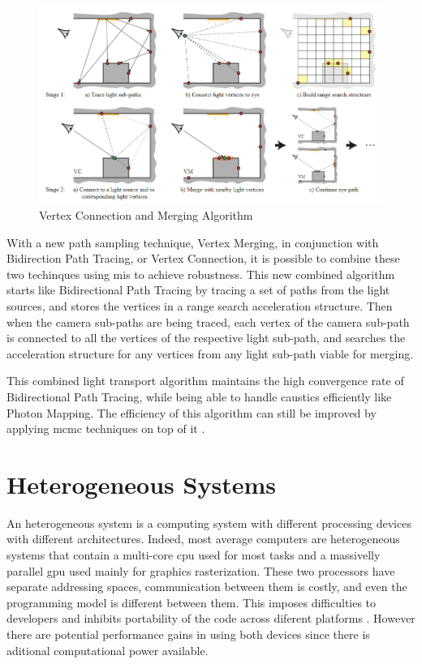 \begin{figure}[H]
\centering
\includegraphics[width=\linewidth]{img/vcmDiagram.png}
\caption{\label{img:vcmdiag} Vertex Connection and Merging Algorithm}
\end{figure}

With a new path sampling technique, Vertex Merging, in conjunction with Bidirection Path Tracing, or Vertex Connection, it is possible to combine these two techinques using \gls{mis} to achieve robustness. This new combined algorithm starts like Bidirectional Path Tracing by tracing a set of paths from the light sources, and stores the vertices in a range search acceleration structure. Then when the camera sub-paths are being traced, each vertex of the camera sub-path is connected to all the vertices of the respective light sub-path, and searches the acceleration structure for any vertices from any light sub-path viable for merging.

This combined light transport algorithm maintains the high convergence rate of Bidirectional Path Tracing, while being able to handle caustics efficiently like Photon Mapping. The efficiency of this algorithm can still be improved by applying \gls{mcmc} techniques on top of it \citep{Georgiev}.

\section{Heterogeneous Systems}

An heterogeneous system is a computing system with different processing devices with different architectures. Indeed, most average computers are heterogeneous systems that contain a multi-core \gls{cpu} used for most tasks and a massivelly parallel \gls{gpu} used mainly for graphics rasterization. These two processors have separate addressing spaces, communication between them is costly, and even the programming model is different between them. This imposes difficulties to developers and inhibits portability of the code across diferent platforms \citep{Kunzman}. However there are potential performance gains in using both devices since there is aditional computational power available. 

